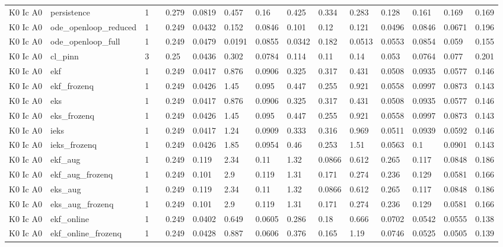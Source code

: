 \begin{table}[t]
\begin{tabular}{lllllllllllllll}
K0 Ic A0 & persistence & 1 &  & 0.279 & 0.0819 & 0.457 & 0.16 & 0.425 & 0.334 & 0.283 & 0.128 & 0.161 & 0.169 & 0.169 \\
K0 Ic A0 & ode\_openloop\_reduced & 1 &  & 0.249 & 0.0432 & 0.152 & 0.0846 & 0.101 & 0.12 & 0.121 & 0.0496 & 0.0846 & 0.0671 & 0.196 \\
K0 Ic A0 & ode\_openloop\_full & 1 &  & 0.249 & 0.0479 & 0.0191 & 0.0855 & 0.0342 & 0.182 & 0.0513 & 0.0553 & 0.0854 & 0.059 & 0.155 \\
K0 Ic A0 & cl\_pinn & 3 &  & 0.25 & 0.0436 & 0.302 & 0.0784 & 0.114 & 0.11 & 0.14 & 0.053 & 0.0764 & 0.077 & 0.201 \\
K0 Ic A0 & ekf & 1 &  & 0.249 & 0.0417 & 0.876 & 0.0906 & 0.325 & 0.317 & 0.431 & 0.0508 & 0.0935 & 0.0577 & 0.146 \\
K0 Ic A0 & ekf\_frozenq & 1 &  & 0.249 & 0.0426 & 1.45 & 0.095 & 0.447 & 0.255 & 0.921 & 0.0558 & 0.0997 & 0.0873 & 0.143 \\
K0 Ic A0 & eks & 1 &  & 0.249 & 0.0417 & 0.876 & 0.0906 & 0.325 & 0.317 & 0.431 & 0.0508 & 0.0935 & 0.0577 & 0.146 \\
K0 Ic A0 & eks\_frozenq & 1 &  & 0.249 & 0.0426 & 1.45 & 0.095 & 0.447 & 0.255 & 0.921 & 0.0558 & 0.0997 & 0.0873 & 0.143 \\
K0 Ic A0 & ieks & 1 &  & 0.249 & 0.0417 & 1.24 & 0.0909 & 0.333 & 0.316 & 0.969 & 0.0511 & 0.0939 & 0.0592 & 0.146 \\
K0 Ic A0 & ieks\_frozenq & 1 &  & 0.249 & 0.0426 & 1.85 & 0.0954 & 0.46 & 0.253 & 1.51 & 0.0563 & 0.1 & 0.0901 & 0.143 \\
K0 Ic A0 & ekf\_aug & 1 &  & 0.249 & 0.119 & 2.34 & 0.11 & 1.32 & 0.0866 & 0.612 & 0.265 & 0.117 & 0.0848 & 0.186 \\
K0 Ic A0 & ekf\_aug\_frozenq & 1 &  & 0.249 & 0.101 & 2.9 & 0.119 & 1.31 & 0.171 & 0.274 & 0.236 & 0.129 & 0.0581 & 0.166 \\
K0 Ic A0 & eks\_aug & 1 &  & 0.249 & 0.119 & 2.34 & 0.11 & 1.32 & 0.0866 & 0.612 & 0.265 & 0.117 & 0.0848 & 0.186 \\
K0 Ic A0 & eks\_aug\_frozenq & 1 &  & 0.249 & 0.101 & 2.9 & 0.119 & 1.31 & 0.171 & 0.274 & 0.236 & 0.129 & 0.0581 & 0.166 \\
K0 Ic A0 & ekf\_online & 1 &  & 0.249 & 0.0402 & 0.649 & 0.0605 & 0.286 & 0.18 & 0.666 & 0.0702 & 0.0542 & 0.0555 & 0.138 \\
K0 Ic A0 & ekf\_online\_frozenq & 1 &  & 0.249 & 0.0428 & 0.887 & 0.0606 & 0.376 & 0.165 & 1.19 & 0.0746 & 0.0525 & 0.0505 & 0.139 \\

\end{tabular}
\end{table}
